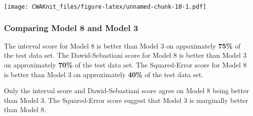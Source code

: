 \documentclass[]{article}
\newenvironment{Shaded}{\begin{snugshade}}{\end{snugshade}}
\newcommand{\KeywordTok}[1]{\textcolor[rgb]{0.13,0.29,0.53}{\textbf{#1}}}
\newcommand{\DataTypeTok}[1]{\textcolor[rgb]{0.13,0.29,0.53}{#1}}
\newcommand{\DecValTok}[1]{\textcolor[rgb]{0.00,0.00,0.81}{#1}}
\newcommand{\StringTok}[1]{\textcolor[rgb]{0.31,0.60,0.02}{#1}}
\newcommand{\OperatorTok}[1]{\textcolor[rgb]{0.81,0.36,0.00}{\textbf{#1}}}
\newcommand{\NormalTok}[1]{#1}
\begin{document}
\texttt{[image: CWAKnit\_files/figure-latex/unnamed-chunk-10-1.pdf]}

\subsubsection{Comparing Model 8 and Model
3}\label{comparing-model-8-and-model-3}

The interval score for Model 8 is better than Model 3 on appoximately
\textbf{75\%} of the test data set. The Dawid-Sebastiani score for Model
8 is better than Model 3 on approximately \textbf{70\%} of the test data
set. The Squared-Error score for Model 8 is better than Model 3 on
approximately \textbf{40\%} of the test data set.

Only the interval score and Dawid-Sebastiani score agree on Model 8
being better than Model 3. The Squared-Error score suggest that Model 3
is marginally better than Model 8.

\begin{Shaded}
\end{Shaded}
\end{document}
